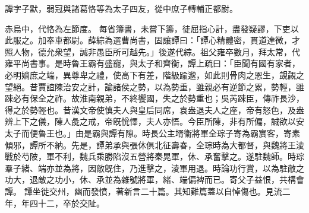 \begin{pinyinscope}
 
 
 譚字子默，弱冠與諸葛恪等為太子四友，從中庶子轉輔正都尉。
 
 
 赤烏中，代恪為左節度。
 每省簿書，未嘗下籌，徒屈指心計，盡發疑謬，下吏以此服之。加奉車都尉。薛綜為選曹尚書，固讓譚曰：「譚心精體密，貫道達微，才照人物，德允衆望，誠非愚臣所可越先。」後遂代綜。祖父雍卒數月，拜太常，代雍平尚書事。是時魯王霸有盛寵，與太子和齊衡，譚上疏曰：「臣聞有國有家者，必明嫡庶之端，異尊卑之禮，使高下有差，階級踰邈，如此則骨肉之恩生，覬覦之望絕。昔賈誼陳治安之計，論諸侯之勢，以為勢重，雖親必有逆節之累，勢輕，雖踈必有保全之祚。故淮南親弟，不終饗國，失之於勢重也；吳芮踈臣，傳祚長沙，得之於勢輕也。昔漢文帝使慎夫人與皇后同席，袁盎退夫人之座，帝有怒色，及盎辨上下之儀，陳人彘之戒，帝旣恱懌，夫人亦悟。今臣所陳，非有所偏，誠欲以安太子而便魯王也。」由是霸與譚有隙。時長公主壻衞將軍全琮子寄為霸賔客，寄素傾邪，譚所不納。先是，譚弟承與張休俱北征壽春，全琮時為大都督，與魏將王淩戰於芍陂，軍不利，魏兵乘勝陷沒五營將秦晃軍，休、承奮擊之。遂駐魏師。時琮羣子緒、端亦並為將，因敵旣住，乃進擊之，淩軍用退。時論功行賞，以為駐敵之功大，退敵之功小，休、承並為雜號將軍，緒、端偏裨而已。寄父子益恨，共構會譚。
 譚坐徙交州，幽而發憤，著新言二十篇。其知難篇蓋以自悼傷也。見流二年，年四十二，卒於交阯。
 
 
\end{pinyinscope}